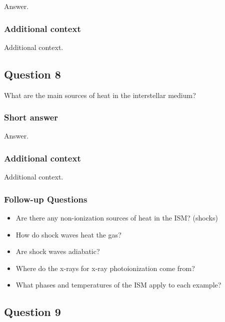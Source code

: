 \documentclass[a4paper,10pt]{article}
\begin{document}
Answer.

\subsubsection{Additional context}

Additional context.


\newpage
\subsection{Question 8}

What are the main sources of heat in the interstellar medium?

\subsubsection{Short answer}

Answer.

\subsubsection{Additional context}

Additional context.

\subsubsection{Follow-up Questions}

\begin{itemize}
    \item Are there any non-ionization sources of heat in the ISM? (shocks)
    \item How do shock waves heat the gas?
    \item Are shock waves adiabatic?
    \item Where do the x-rays for x-ray photoionization come from?
    \item What phases and temperatures of the ISM apply to each example?
\end{itemize}


\newpage
\subsection{Question 9}
\end{document}
